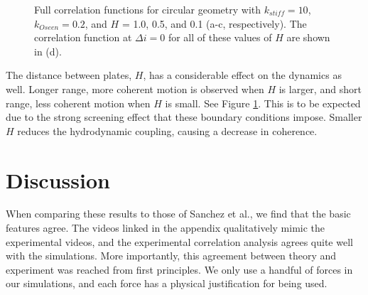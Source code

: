 \documentclass[11pt]{ucthesis}
\begin{document}
\begin{figure}
{}
\qquad
{}
\caption{Full correlation functions for circular geometry with
$k_{stiff}=10$, $k_{Oseen}=0.2$, and $H$ = 1.0, 0.5, and 0.1 (a-c,
respectively). The correlation function at $\Delta i = 0$ for all
of these values of $H$ are shown in (d).  
\label{fig:H}} 
\end{figure}


The distance between plates, $H$, has a considerable effect on the dynamics
as well. Longer range, more coherent motion is observed when $H$ is larger, and
short range, less coherent motion when $H$ is small. See Figure \ref{fig:H}. This
is to be expected due to the strong screening effect that these boundary conditions
impose. Smaller $H$ reduces the hydrodynamic coupling, causing a decrease in coherence.


\section{Discussion}
\label{sec:disc}
When comparing these results to those of
Sanchez et al., we find that the basic features agree. The videos
linked in the appendix qualitatively mimic the
experimental videos, and the experimental correlation analysis
agrees quite well with the simulations. More importantly, this agreement between
theory and experiment was reached from first principles. We only
use a handful of forces in our simulations, and each force has a
physical justification for being used.
\end{document}
